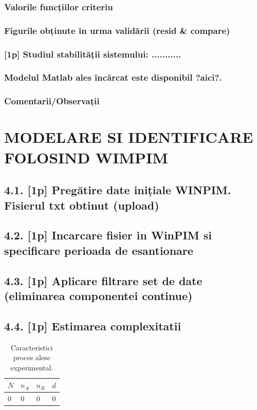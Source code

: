 \documentclass[12pt,english]{article}
\begin{document}
\subsubsection { Valorile funcțiilor criteriu }
\subsubsection { Figurile obținute în urma validării (resid \& compare) }
\subsubsection { [1p] Studiul stabilității sistemului: ........... }
\subsubsection { Modelul Matlab ales încărcat este disponibil ?aici?. }
\subsubsection { Comentarii/Observații }

\section { MODELARE SI IDENTIFICARE FOLOSIND WIMPIM }
\subsection {4.1. [1p] Pregătire date inițiale WINPIM. Fisierul txt obtinut (upload) }
\subsection {4.2. [1p] Incarcare fisier in WinPIM si specificare perioada de esantionare }
\subsection {4.3. [1p] Aplicare filtrare set de date (eliminarea componentei continue) }
\subsection {4.4. [1p] Estimarea complexitatii}
\begin{table}[H]
  \centering
    \begin{tabular}{|l|l|l|l|}
      \hline
      $N$ & $n_A$ & $n_B$ & $d$ \\
      \hline
      0 & 0 & 0 & 0 \\
      \hline
    \end{tabular}
    \caption{Caracteristici proces alese experimental.}
\end{table}
\end{document}
